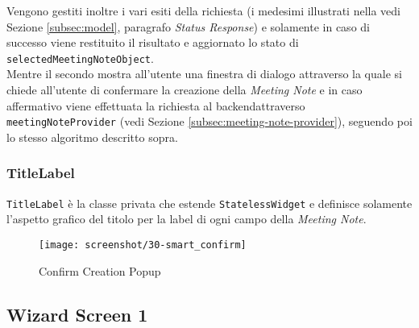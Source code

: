 Vengono gestiti inoltre i vari esiti della richiesta (i medesimi illustrati nella vedi Sezione \ref{subsec:model},  paragrafo \emph{Status Response}) e solamente in caso di successo viene restituito il risultato e aggiornato lo stato di \lstinline{selectedMeetingNoteObject}. \\
Mentre il secondo mostra all'utente una finestra di dialogo attraverso la quale si chiede all'utente di confermare la creazione della \emph{Meeting Note} e in caso affermativo viene effettuata la richiesta al \gls{backend}\glsoccur attraverso \lstinline{meetingNoteProvider} (vedi Sezione \ref{subsec:meeting-note-provider}), seguendo poi lo stesso algoritmo descritto sopra.

\subsubsection*{TitleLabel}
\label{subsubsec:title-label}

\lstinline{TitleLabel} è la classe privata che estende \lstinline{StatelessWidget} e definisce solamente l'aspetto grafico del titolo per la label di ogni campo della \emph{Meeting Note}.

\begin{figure}[!h] 
    \centering 
    \texttt{[image: screenshot/30-smart\_confirm]} 
    \caption{Confirm Creation Popup}
    \label{fig:smart-popup}
\end{figure}

\subsection{Wizard Screen 1}
\label{subsec:wizard-screen-1}

